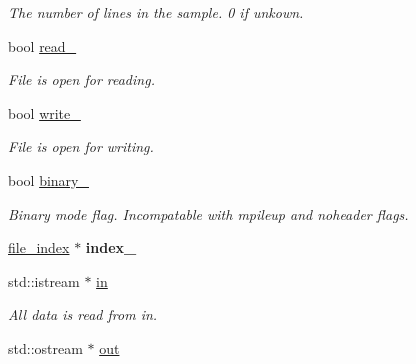 \begin{DoxyCompactItemize}
\begin{DoxyCompactList}\small\item\em The number of lines in the sample. 0 if unkown. \end{DoxyCompactList}\item 
\hypertarget{classmap__file_a51f5f880c8b524d7305454326234ac29}{bool \hyperlink{classmap__file_a51f5f880c8b524d7305454326234ac29}{read\-\_\-}}\label{classmap__file_a51f5f880c8b524d7305454326234ac29}

\begin{DoxyCompactList}\small\item\em File is open for reading. \end{DoxyCompactList}\item 
\hypertarget{classmap__file_a9b8eef15e57e955a5ebcf8109e7d0822}{bool \hyperlink{classmap__file_a9b8eef15e57e955a5ebcf8109e7d0822}{write\-\_\-}}\label{classmap__file_a9b8eef15e57e955a5ebcf8109e7d0822}

\begin{DoxyCompactList}\small\item\em File is open for writing. \end{DoxyCompactList}\item 
\hypertarget{classmap__file_a4ae2befbf4e2cd948c35a9e2c6b13702}{bool \hyperlink{classmap__file_a4ae2befbf4e2cd948c35a9e2c6b13702}{binary\-\_\-}}\label{classmap__file_a4ae2befbf4e2cd948c35a9e2c6b13702}

\begin{DoxyCompactList}\small\item\em Binary mode flag. Incompatable with mpileup and noheader flags. \end{DoxyCompactList}\item 
\hypertarget{classmap__file_a06717cb05f3419f1315f70b9e48d92ed}{\hyperlink{classfile__index}{file\-\_\-index} $\ast$ {\bfseries index\-\_\-}}\label{classmap__file_a06717cb05f3419f1315f70b9e48d92ed}

\item 
\hypertarget{classmap__file_a916592b36b507bb1b2e4d3bb00dcf840}{std\-::istream $\ast$ \hyperlink{classmap__file_a916592b36b507bb1b2e4d3bb00dcf840}{in}}\label{classmap__file_a916592b36b507bb1b2e4d3bb00dcf840}

\begin{DoxyCompactList}\small\item\em All data is read from in. \end{DoxyCompactList}\item 
\hypertarget{classmap__file_ac7f3fc1cd6174721d5b09ff7d68a7d08}{std\-::ostream $\ast$ \hyperlink{classmap__file_ac7f3fc1cd6174721d5b09ff7d68a7d08}{out}}\label{classmap__file_ac7f3fc1cd6174721d5b09ff7d68a7d08}


\end{DoxyCompactItemize}
